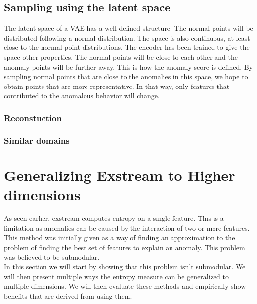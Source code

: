 \documentclass[oneside, a4paper, onecolumn, 11pt]{article}
\begin{document}
\subsection{Sampling using the latent space}
The latent space of a VAE has a well defined structure. The normal points will be distributed following a normal distribution. The space is also continuous, at least close to the normal point distributions. The encoder has been trained to give the space other properties. The normal points will be close to each other and the anomaly points will be further away. This is how the anomaly score is defined. By sampling normal points that are close to the anomalies in this space, we hope to obtain points that are more representative. In that way, only features that contributed to the anomalous behavior will change.\\
\subsubsection{Reconstuction}
\subsubsection{Similar domains}


\section{Generalizing Exstream to Higher dimensions}
As seen earlier, exstream computes entropy on a single feature. This is a limitation as anomalies can be caused by the interaction of two or more features. This method was initially given as a way of finding an approximation to the problem of finding the best set of features to explain an anomaly. This problem was believed to be submodular.\\
In this section we will start by showing that this problem isn't submodular. We will then present multiple ways the entropy measure can be generalized to multiple dimensions. We will then evaluate these methods and empirically show benefits that are derived from using them.\\
\end{document}

